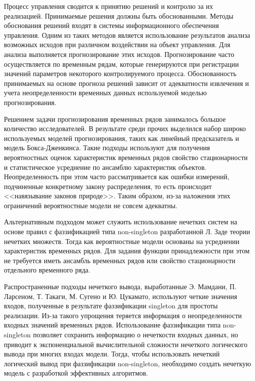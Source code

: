
{\actuality} Процесс управления сводится к принятию решений и контролю за их реализацией. Принимаемые решения должны быть обоснованными. Методы обоснования решений входят в системы информационного обеспечения управления. Одним из таких методов является использование результатов анализа возможных исходов при различном воздействии на объект управления. Для анализа выполняется прогнозирование этих исходов. Прогнозирование часто осуществляется по временным рядам, которые генерируются при регистрации значений параметров некоторого контролируемого процесса. Обоснованность принимаемых на основе прогноза решений зависит от адекватности извлечения и учета неопределенности временных данных используемой моделью прогнозирования.

Решением задачи прогнозирования временных рядов занималось большое количество исследователей. В результате среди прочих выделился набор широко используемых моделей прогнозирования, таких как линейный предсказатель и модель Бокса-Дженкинса. Такие подходы используют для получения вероятностных оценок характеристик временных рядов свойство стационарности и статистическое усреднение по ансамблю характеристик объектов. Неопределенность при этом часто рассматривается как ошибки измерений, подчиненные конкретному закону распределения, то есть происходит <<навязывание законов природе>>. Таким образом, из-за наложения этих ограничений вероятностные модели не совсем адекватны.

Альтернативным подходом может служить использование нечетких систем на основе правил с фаззификацией типа non-singleton разработанной Л. Заде теории нечетких множеств. Тогда как вероятностные модели основаны на усреднении характеристик временных рядов. Для задания функции принадлежности при этом не требуется иметь ансамбль временных рядов или свойство стационарности отдельного временного ряда.

{\progress} Распространенные подходы нечеткого вывода, выработанные Э. Мамдани, П. Ларсеном, Т. Такаги, М. Сугено и Ю. Цукамато, используют четкие значения входов, полученные в результате фаззификации singleton для простоты реализации. Из-за такого упрощения теряется информация о неопределенности входных значений временных рядов. Использование фаззификации типа non-singleton позволяет сохранить информацию о нечеткости входных данных, но приводит к экспоненциальной вычислительной сложности нечеткого логического вывода при многих входах модели. Тогда, чтобы использовать нечеткий логический вывод при фаззификации non-singleton, необходимо создать нечеткую модель с разработкой эффективных алгоритмов.
 
